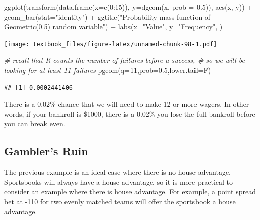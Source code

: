 \documentclass[
  11pt,
]{book}
\newenvironment{Shaded}{\begin{snugshade}}{\end{snugshade}}
\newcommand{\AttributeTok}[1]{\textcolor[rgb]{0.77,0.63,0.00}{#1}}
\newcommand{\CommentTok}[1]{\textcolor[rgb]{0.56,0.35,0.01}{\textit{#1}}}
\newcommand{\DecValTok}[1]{\textcolor[rgb]{0.00,0.00,0.81}{#1}}
\newcommand{\FloatTok}[1]{\textcolor[rgb]{0.00,0.00,0.81}{#1}}
\newcommand{\FunctionTok}[1]{\textcolor[rgb]{0.00,0.00,0.00}{#1}}
\newcommand{\NormalTok}[1]{#1}
\newcommand{\SpecialCharTok}[1]{\textcolor[rgb]{0.00,0.00,0.00}{#1}}
\newcommand{\StringTok}[1]{\textcolor[rgb]{0.31,0.60,0.02}{#1}}
\theoremstyle{definition}
\theoremstyle{definition}
\theoremstyle{definition}
\theoremstyle{definition}
\theoremstyle{remark}
\begin{document}
\begin{Shaded}
\begin{Highlighting}[]
\FunctionTok{ggplot}\NormalTok{(}\FunctionTok{transform}\NormalTok{(}\FunctionTok{data.frame}\NormalTok{(}\AttributeTok{x=}\FunctionTok{c}\NormalTok{(}\DecValTok{0}\SpecialCharTok{:}\DecValTok{15}\NormalTok{)), }\AttributeTok{y=}\FunctionTok{dgeom}\NormalTok{(x, }\AttributeTok{prob =} \FloatTok{0.5}\NormalTok{)), }\FunctionTok{aes}\NormalTok{(x, y)) }\SpecialCharTok{+} 
  \FunctionTok{geom\_bar}\NormalTok{(}\AttributeTok{stat=}\StringTok{"identity"}\NormalTok{) }\SpecialCharTok{+}
  \FunctionTok{ggtitle}\NormalTok{(}\StringTok{"Probability mass function of Geometric(0.5) random variable"}\NormalTok{) }\SpecialCharTok{+}
  \FunctionTok{labs}\NormalTok{(}\AttributeTok{x=}\StringTok{"Value"}\NormalTok{, }\AttributeTok{y=}\StringTok{"Frequency"}\NormalTok{, )}
\end{Highlighting}
\end{Shaded}

\texttt{[image: textbook\_files/figure-latex/unnamed-chunk-98-1.pdf]}

\begin{Shaded}
\begin{Highlighting}[]
\CommentTok{\# recall that R counts the number of failures before a success, }
\CommentTok{\# so we will be looking for at least 11 failures}
\FunctionTok{pgeom}\NormalTok{(}\AttributeTok{q=}\DecValTok{11}\NormalTok{,}\AttributeTok{prob=}\FloatTok{0.5}\NormalTok{,}\AttributeTok{lower.tail=}\NormalTok{F)}
\end{Highlighting}
\end{Shaded}

\begin{verbatim}
## [1] 0.0002441406
\end{verbatim}

There is a 0.02\% chance that we will need to make 12 or more wagers. In other words, if your bankroll is \$1000, there is a 0.02\% you lose the full bankroll before you can break even.

\newpage

\hypertarget{gamblers-ruin}{%
\subsection{Gambler's Ruin}\label{gamblers-ruin}}

The previous example is an ideal case where there is no house advantage. Sportsbooks will always have a house advantage, so it is more practical to consider an example where there is house advantage. For example, a point spread bet at -110 for two evenly matched teams will offer the sportsbook a house advantage.
\end{document}
